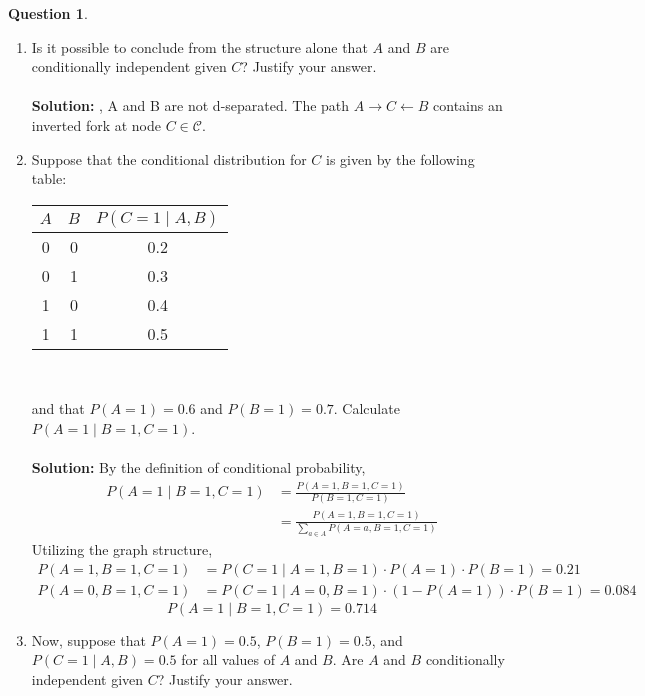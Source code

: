 \documentclass{article}
\theoremstyle{definition}
\newtheorem{question}[thm]{Question}
\begin{document}
\begin{question}
    \begin{enumerate}[label=\alph*)]
        \item Is it possible to conclude from the structure alone that $A$ and $B$ are conditionally independent given $C$? Justify your answer.\\ \\
        \noindent \textbf{Solution: } , A and B are not d-separated. The path $A \rightarrow C \leftarrow B$ contains an inverted fork at node $C \in \mathcal{C}$.
        \item Suppose that the conditional distribution for $C$ is given by the following table:
        \begin{center}
        \begin{tabular}{cc|c}
            \toprule
            $A$ & $B$ & $P(C=1 \mid A,B)$ \\
            \midrule
            0 & 0 & 0.2 \\
            0 & 1 & 0.3 \\
            1 & 0 & 0.4 \\
            1 & 1 & 0.5 \\
            \bottomrule
        \end{tabular}\\
        \end{center}
        and that $P(A=1) = 0.6$ and $P(B=1) = 0.7$. Calculate $P(A=1 \mid B=1, C=1)$.\\ \\
        \noindent \textbf{Solution: } By the definition of conditional probability,
        \begin{align*}
            P(A=1\mid B=1,C=1) &= \frac{P(A=1,B=1,C=1)}{P(B=1,C=1)}\\
                        &= \frac{P(A=1,B=1,C=1)}{\sum_{a \in A}P(A=a,B=1,C=1)}
        \end{align*}
        Utilizing the graph structure,
        \begin{align*}
            P(A=1,B=1,C=1) &= P(C=1\mid A=1,B=1)\cdot P(A=1) \cdot P(B=1) = 0.21\\
            P(A=0,B=1,C=1) &= P(C=1\mid A=0,B=1)\cdot (1 -P(A=1)) \cdot P(B=1) = 0.084
        \end{align*}
        \begin{equation*}
            P(A=1\mid B=1,C=1) = \boxed{0.714}
        \end{equation*}
        \newpage
        \item Now, suppose that $P(A=1) = 0.5$, $P(B=1) = 0.5$, and $P(C=1 \mid A, B) = 0.5$ for all values of $A$ and $B$. Are $A$ and $B$ conditionally independent given $C$? Justify your answer.

\end{enumerate}
\end{question}
\end{document}
